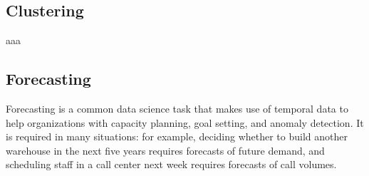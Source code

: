 \documentclass[a4paper]{article} %
\begin{document}
	\subsection{ Clustering } \label{ssec:clustering}
	aaa
	
	
	\subsection{ Forecasting } \label{sec:forecasting}
	Forecasting is a common data science task that makes use of temporal data \cite{ForecastingSurvey} to help organizations with capacity planning, goal setting, and anomaly detection. It is required in many situations: for example, deciding whether to build another warehouse in the next five years requires forecasts of future demand, and scheduling staff in a call center next week requires forecasts of call volumes.
	
\end{document}
